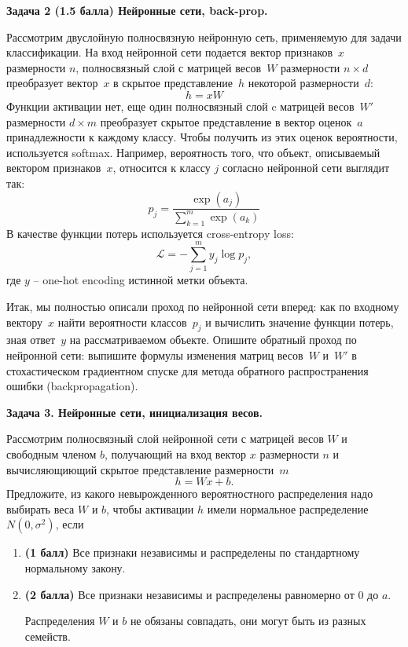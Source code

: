 \documentclass[10pt]{article}
\begin{document}
\bigskip

\textbf{Задача 2 (1.5 балла) Нейронные сети, back-prop.}

    Рассмотрим двуслойную полносвязную нейронную сеть, применяемую для задачи классификации.
    На вход нейронной сети подается вектор признаков~$x$ размерности $n$, полносвязный слой с матрицей весов~$W$ размерности ${n\times d}$ преобразует вектор~$x$ в скрытое представление~$h$ некоторой размерности~$d$:
    \[
    h = x W
    \]
    Функции активации нет, еще один полносвязный слой c матрицей весов~$W'$ размерности ${d \times m}$ преобразует скрытое представление в вектор оценок~$a$ принадлежности к каждому классу.
    Чтобы получить из этих оценок вероятности, используется softmax. Например, вероятность того, что объект, описываемый вектором признаков~$x$, относится к классу $j$ согласно нейронной сети выглядит так:
    \[
    p_j = \frac{\exp(a_j)}{\sum_{k=1}^{m} \exp(a_k)}
    \]
    В качестве функции потерь используется cross-entropy loss:
    \[
    \mathcal{L} = - \sum_{j=1}^{m} y_j \log p_j, 
    \]
    где $y$ -- one-hot encoding истинной метки объекта.
    
    Итак, мы полностью описали проход по нейронной сети вперед: как по входному вектору~$x$ найти вероятности классов~$p_j$ и вычислить значение функции потерь, зная ответ~$y$ на рассматриваемом объекте. Опишите обратный проход по нейронной сети: выпишите формулы изменения матриц весов~$W$ и~$W'$ в стохастическом градиентном спуске для метода обратного распространения ошибки (backpropagation).

\bigskip
\newpage
\textbf{Задача 3.  Нейронные сети, инициализация весов.}

Рассмотрим полносвязный слой нейронной сети с матрицей весов $W$ и свободным членом $b$, получающий на вход вектор $x$ размерности $n$ и вычисляющиющий скрытое представление размерности~$m$
$$h = Wx + b.$$ 
Предложите, из какого невырожденного вероятностного распределения надо выбирать веса $W$ и $b$, чтобы активации $h$ имели нормальное распределение $N(0,\sigma^2)$, если
\begin{enumerate}[label=(\alph*)]
\item \textbf{(1 балл)} Все признаки независимы и распределены по стандартному нормальному закону.
\item \textbf{(2 балла)} Все признаки независимы и распределены равномерно от $0$ до $a$.

Распределения $W$ и $b$ не обязаны совпадать, они могут быть из разных семейств.
\end{enumerate}
\end{document}
